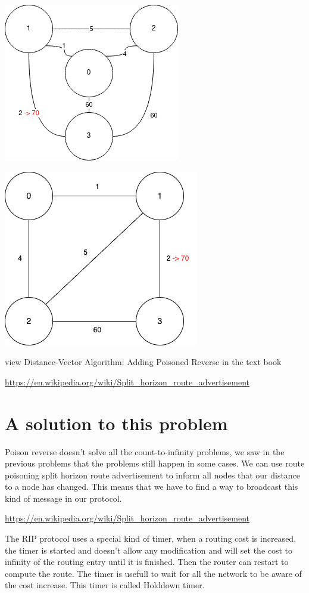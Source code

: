 \documentclass[a4paper,11pt,final]{report}
\begin{document}
\includegraphics{upload_97a25790f5b60891fe1985f10196c3b7.png}

\includegraphics{upload_c90a572c0f84e1b171cf1dd6aac089d3.png}

view Distance-Vector Algorithm: Adding Poisoned Reverse in the text book

\url{https://en.wikipedia.org/wiki/Split\_horizon\_route\_advertisement}

\chapter{A solution to this problem}

Poison reverse doesn't solve all the count-to-infinity problems, we saw
in the previous problems that the problems still happen in some cases.
We can use route poisoning split horizon route advertisement to inform
all nodes that our distance to a node has changed. This means that we
have to find a way to broadcast this kind of message in our protocol.

\url{https://en.wikipedia.org/wiki/Split\_horizon\_route\_advertisement}

The RIP protocol uses a special kind of timer, when a routing cost is
increased, the timer is started and doesn't allow any modification and
will set the cost to infinity of the routing entry until it is finished.
Then the router can restart to compute the route. The timer is usefull
to wait for all the network to be aware of the cost increase. This timer
is called Holddown timer.
\end{document}

